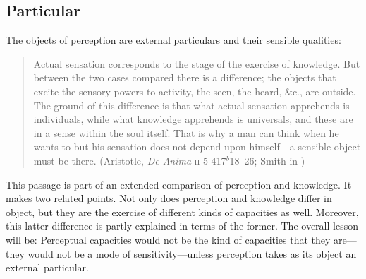 

\subsection{Particular} %
\label{sub:particular}
The objects of perception are external particulars and their sensible qualities:
\begin{quote}
	Actual sensation corresponds to the stage of the exercise of knowledge. But between the two cases compared there is a difference; the objects that excite the sensory powers to activity, the seen, the heard, \&c., are outside. The ground of this difference is that what actual sensation apprehends is individuals, while what knowledge apprehends is universals, and these are in a sense within the soul itself. That is why a man can think when he wants to but his sensation does not depend upon himself---a sensible object must be there. (Aristotle, \emph{De Anima} \textsc{ii} 5 417\( ^{b} \)18--26; Smith in \citealt[31]{Barnes:1984uq})
\end{quote}
This passage is part of an extended comparison of perception and knowledge. It makes two related points. Not only does perception and knowledge differ in object, but they are the exercise of different kinds of capacities as well. Moreover, this latter difference is partly explained in terms of the former. The overall lesson will be: Perceptual capacities would not be the kind of capacities that they are---they would not be a mode of sensitivity---unless perception takes as its object an external particular.

